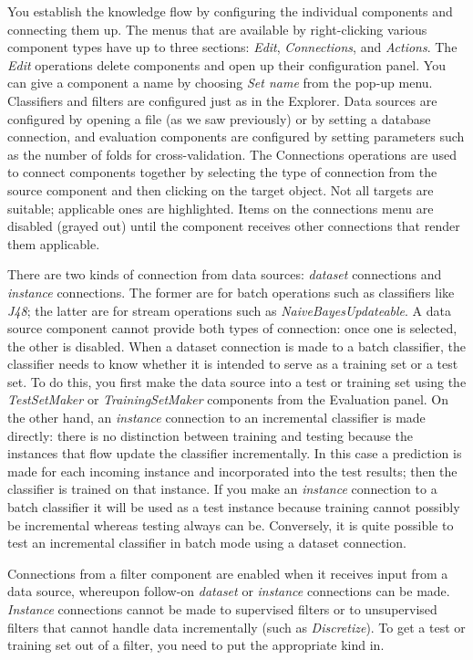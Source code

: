 You establish the knowledge flow by configuring the individual
components and connecting them up. The menus that are available by
right-clicking various component types have up to three sections:
\textit{Edit}, \textit{Connections}, and \textit{Actions}. 
The \textit{Edit} operations delete components and open up their
configuration panel. You can give a component a name by
choosing \textit{Set name} from the pop-up menu. Classifiers
and filters are configured just as in the Explorer. Data sources are
configured by opening a file (as we saw previously) or by setting a
database connection, and evaluation components are configured by
setting parameters such as the number of folds for
cross-validation. The Connections operations are used to connect
components together by selecting the type of connection from the
source component and then clicking on the target object. Not all
targets are suitable; applicable ones are highlighted. Items on the
connections menu are disabled (grayed out) until the component
receives other connections that render them applicable.

There are two kinds of connection from data sources: \textit{dataset}
connections and \textit{instance} connections. The former are for
batch operations such as classifiers like \textit{J48}; the latter are
for stream operations such as \textit{NaiveBayesUpdateable}. A data
source component cannot provide both types of connection: once one is
selected, the other is disabled. When a dataset connection is made to
a batch classifier, the classifier needs to know whether it is
intended to serve as a training set or a test set. To do this, you
first make the data source into a test or training set using the
\textit{TestSetMaker} or \textit{TrainingSetMaker} components from the Evaluation
panel. On the other hand, an \textit{instance} connection to an
incremental classifier is made directly: there is no distinction
between training and testing because the instances that flow update
the classifier incrementally. In this case a prediction is made for
each incoming instance and incorporated into the test results; then
the classifier is trained on that instance. If you make
an \textit{instance} connection to a batch classifier it will be used
as a test instance because training cannot possibly be incremental
whereas testing always can be. Conversely, it is quite possible to
test an incremental classifier in batch mode using a dataset
connection.

Connections from a filter component are enabled when it receives input
from a data source, whereupon follow-on \textit{dataset}
or \textit{instance} connections can be made. \textit{Instance}
connections cannot be made to supervised filters or to unsupervised
filters that cannot handle data incrementally (such
as \textit{Discretize}). To get a test or training set out of a
filter, you need to put the appropriate kind in.

